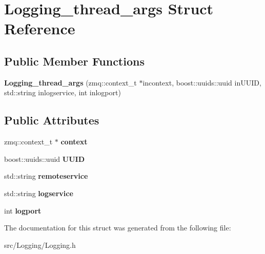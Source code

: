 \hypertarget{structLogging__thread__args}{\section{Logging\-\_\-thread\-\_\-args Struct Reference}
\label{structLogging__thread__args}
}
\subsection*{Public Member Functions}
\begin{DoxyCompactItemize}
\item 
\hypertarget{structLogging__thread__args_a9496cec11539e17b104d3cbdf3174fdb}{{\bfseries Logging\-\_\-thread\-\_\-args} (zmq\-::context\-\_\-t $\ast$incontext, boost\-::uuids\-::uuid in\-U\-U\-I\-D, std\-::string inlogservice, int inlogport)}\label{structLogging__thread__args_a9496cec11539e17b104d3cbdf3174fdb}

\end{DoxyCompactItemize}
\subsection*{Public Attributes}
\begin{DoxyCompactItemize}
\item 
\hypertarget{structLogging__thread__args_addacf7a55861c13832a75b88d74c006c}{zmq\-::context\-\_\-t $\ast$ {\bfseries context}}\label{structLogging__thread__args_addacf7a55861c13832a75b88d74c006c}

\item 
\hypertarget{structLogging__thread__args_a3a7c5617b7fa5214c6da407a23266d57}{boost\-::uuids\-::uuid {\bfseries U\-U\-I\-D}}\label{structLogging__thread__args_a3a7c5617b7fa5214c6da407a23266d57}

\item 
\hypertarget{structLogging__thread__args_aca2cf6dcba1d9051506134e9bf26d786}{std\-::string {\bfseries remoteservice}}\label{structLogging__thread__args_aca2cf6dcba1d9051506134e9bf26d786}

\item 
\hypertarget{structLogging__thread__args_a5a8e255209f5c171a7fbd78f0e308087}{std\-::string {\bfseries logservice}}\label{structLogging__thread__args_a5a8e255209f5c171a7fbd78f0e308087}

\item 
\hypertarget{structLogging__thread__args_ad5ab1c21e226a694c7f813bcb3ef9002}{int {\bfseries logport}}\label{structLogging__thread__args_ad5ab1c21e226a694c7f813bcb3ef9002}

\end{DoxyCompactItemize}


The documentation for this struct was generated from the following file\-:\begin{DoxyCompactItemize}
\item 
src/\-Logging/Logging.\-h\end{DoxyCompactItemize}
